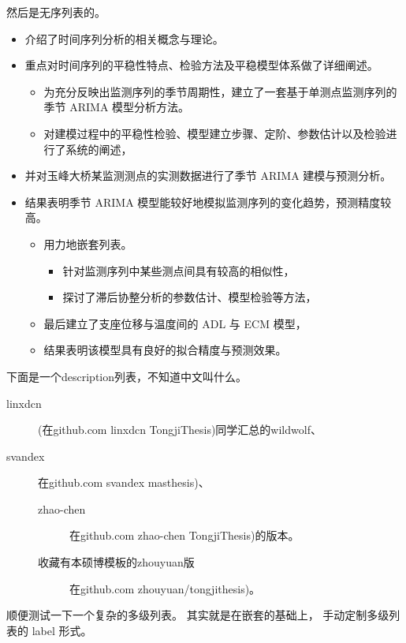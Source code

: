 \documentclass[../Main/thesis]{subfiles}
\begin{document}
然后是无序列表的。
\begin{itemize}
  \item 介绍了时间序列分析的相关概念与理论。
  \item 重点对时间序列的平稳性特点、检验方法及平稳模型体系做了详细阐述。
  \begin{itemize}
    \item 为充分反映出监测序列的季节周期性，建立了一套基于单测点监测序列的季节 ARIMA 模型分析方法。
    \item 对建模过程中的平稳性检验、模型建立步骤、定阶、参数估计以及检验进行了系统的阐述，
  \end{itemize}
  \item 并对玉峰大桥某监测测点的实测数据进行了季节 ARIMA 建模与预测分析。
  \item 结果表明季节 ARIMA 模型能较好地模拟监测序列的变化趋势，预测精度较高。
  \begin{itemize}
    \item 用力地嵌套列表。
    \begin{itemize}
      \item 针对监测序列中某些测点间具有较高的相似性，
      \item 探讨了滞后协整分析的参数估计、模型检验等方法，
    \end{itemize}
    \item 最后建立了支座位移与温度间的 ADL 与 ECM 模型，
    \item 结果表明该模型具有良好的拟合精度与预测效果。
  \end{itemize}
\end{itemize}

下面是一个description列表，不知道中文叫什么。

\begin{description}
  \item [linxdcn] (在github.com linxdcn TongjiThesis)同学汇总的wildwolf、
  \item [svandex] 在github.com svandex masthesis)、
  \begin{description}
    \item [zhao-chen] 在github.com zhao-chen TongjiThesis)的版本。
    \item [收藏有本硕博模板的zhouyuan版] 在github.com zhouyuan/tongjithesis)。
  \end{description}
\end{description}

\zhlipsum[33]

顺便测试一下一个复杂的多级列表。
其实就是在嵌套的基础上， 手动定制多级列表的 label 形式。
\end{document}
